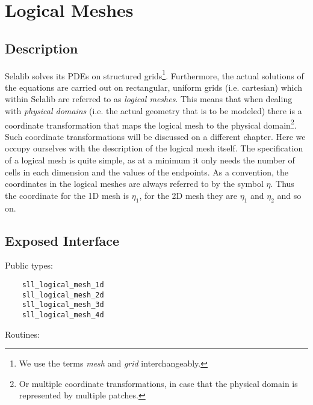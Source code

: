 \documentclass[]{report}   %
\begin{document}
\section{Logical Meshes}

    \subsection{Description}
    
    Selalib solves its PDEs on structured grids\footnote{We use the terms \emph{mesh} and \emph{grid} interchangeably.}. Furthermore, the actual solutions of the equations are carried out on rectangular, uniform grids (i.e. cartesian) which within Selalib are referred to as \emph{logical meshes}. This means that when dealing with \emph{physical domains} (i.e. the actual geometry that is to be modeled) there is a coordinate transformation that maps the logical mesh to the physical domain\footnote{Or multiple coordinate transformations, in case that the physical domain is represented by multiple patches.}. Such coordinate transformations will be discussed on a different chapter. Here we occupy ourselves with the description of the logical mesh itself. The specification of a logical mesh is quite simple, as at a minimum it only needs the number of cells in each dimension and the values of the endpoints. As a convention, the coordinates in the logical meshes are always referred to by the symbol $\eta$. Thus the coordinate for the 1D mesh is $\eta_1$, for the 2D mesh they are $\eta_1$ and $\eta_2$ and so on.


    \subsection{Exposed Interface}
    
    
    Public types:
    
    \begin{verbatim}
    sll_logical_mesh_1d
    sll_logical_mesh_2d
    sll_logical_mesh_3d
    sll_logical_mesh_4d
     \end{verbatim}
     
    Routines:
     
\end{document}
